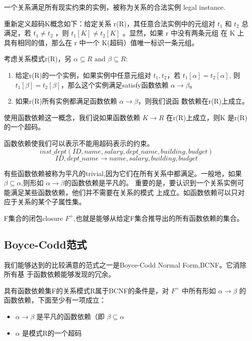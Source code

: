 \documentclass{dingjia}
\begin{document}
一个关系满足所有现实约束的实例，被称为关系的合法实例 legal instance.

重新定义超码K概念如下：给定关系 r(R)，其任意合法实例中的元组对 $t_1$ 和 $t_2$ 总
满足，若 $t_1 \neq t_2$ ，则 $t_1[K] \neq t_2[K]$ 。显然，如果 r 中没有两条元组
在 K 上具有相同的值，那么在 r 中一个 K(超码）值唯一标识一条元组。

考虑关系模式r(R)，另 $\alpha \subseteq R \text{ and } \beta \subseteq R$:
\begin{enumerate}
\item 给定r(R)的一个实例，如果实例中任意元组对 $t_1,t_2$，若 $t_1[\alpha] = t_2[\alpha]$,
  则$t_1[\beta] = t_2[\beta]$，那么这个实例满足satisfy函数依赖 $\alpha \rightarrow \beta$。

\item 如果r(R)所有实例都满足函数依赖 $\alpha \rightarrow \beta$，则我们说函
  数依赖在r(R)上成立。
\end{enumerate}

使用函数依赖这一概念，我们说如果函数依赖 $K \rightarrow R$ 在r(R)上成立，则K
是r(R)的一个超码。

函数依赖使我们可以表示不能用超码表示的约束。
\[ inst\_dept ( ID, name, salary, dept\_name, building, budget)\]
\[ ID, dept\_name \rightarrow name, salary, building, budget \]

有些函数依赖被称为平凡的trivial,因为它们在所有关系中都满足。一般地，如果 $
\beta \subseteq \alpha$,则形如 $\alpha \rightarrow \beta$的函数依赖是平凡的。
重要的是，要认识到一个关系实例可能满足某些函数依赖，他们并不需要在关系的模式
上成立。如函数依赖可以只对应于关系的某个子属性集。

F集合的闭包closure $F^+$,也就是能够从给定F集合推导出的所有函数依赖的集合。

\subsection{Boyce-Codd范式}

我们能够达到的比较满意的范式之一是Boyce-Codd Normal Form,BCNF。它消除所有基
于函数依赖能够发现的冗余。

具有函数依赖集F的关系模式R属于BCNF的条件是，对 $F^+$ 中所有形如 $\alpha
\rightarrow \beta$ 的函数依赖，下面至少有一项成立：
\begin{itemize}
\item $\alpha \rightarrow \beta$ 是平凡的函数依赖（即 $\beta \subseteq \alpha$
\item $\alpha$ 是模式R的一个超码
\end{itemize}
\end{document}
